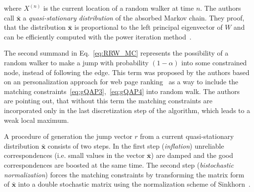 where $X^{(n)}$ is the current location of a random walker at time $n$. The authors call $\mathbf{\bar{x}}$ a \emph{quasi-stationary distribution} of the absorbed Markov chain. They proof, that the distribution $\mathbf{\bar{x}}$ is proportional to the left principal eigenvector of $W$ and can be efficiently computed with the power iteration method~\cite{PowerIteration}.

The second summand in Eq.~\eqref{eq:RRW_MC} represents the possibility of a random walker to make a jump with probability $(1-\alpha)$ into some constrained node, instead of following the edge. This term was proposed by the authors based on an personalization approach for web page ranking~\cite{Langville2003} as a way to include the matching constraints~\eqref{eq:gQAP3},~\eqref{eq:gQAP4} into random walk. The authors are pointing out, that without this term the matching constraints are incorporated only in the last discretization step of the algorithm, which leads to a weak local maximum. 

A procedure of generation the jump vector $r$ from a current quasi-stationary distribution $\mathbf{\bar{x}}$ consists of two steps. In the first step (\emph{inflation}) unreliable correspondences (i.e. small values in the vector $\mathbf{\bar{x}}$) are damped and the good correspondences are boosted at the same time. The second step (\emph{bistochastic normalization}) forces the matching constraints by transforming the matrix form of $\mathbf{\bar{x}}$ into a double stochastic matrix using the normalization scheme of Sinkhorn~\cite{Sinkhorn1964}. 

